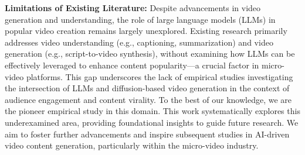 \noindent \textbf{Limitations of Existing Literature:} Despite advancements in video generation and understanding, the role of large language models (LLMs) in popular video creation remains largely unexplored. Existing research primarily addresses video understanding (e.g., captioning, summarization) and video generation (e.g., script-to-video synthesis), without examining how LLMs can be effectively leveraged to enhance content popularity—a crucial factor in micro-video platforms. This gap underscores the lack of empirical studies investigating the intersection of LLMs and diffusion-based video generation in the context of audience engagement and content virality. To the best of our knowledge, we are the pioneer empirical study in this domain. This work systematically explores this underexamined area, providing foundational insights to guide future research. We aim to foster further advancements and inspire subsequent studies in AI-driven video content generation, particularly within the micro-video industry.